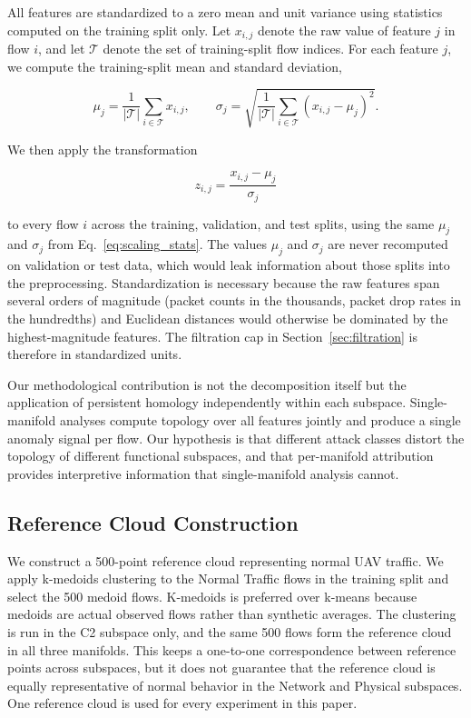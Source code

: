 \documentclass[conf]{new-aiaa}
\begin{document}
All features are standardized to a zero mean and unit variance using statistics computed on the training split only. Let $x_{i,j}$ denote the raw value of feature $j$ in flow $i$, and let $\mathcal{T}$ denote the set of training-split flow indices. For each feature $j$, we compute the training-split mean and standard deviation,

\begin{equation}
\mu_j = \frac{1}{|\mathcal{T}|} \sum_{i \in \mathcal{T}} x_{i,j}, \qquad \sigma_j = \sqrt{\frac{1}{|\mathcal{T}|} \sum_{i \in \mathcal{T}} (x_{i,j} - \mu_j)^2}.
\label{eq:scaling_stats}
\end{equation}

We then apply the transformation

\begin{equation}
z_{i,j} = \frac{x_{i,j} - \mu_j}{\sigma_j}
\label{eq:zscore}
\end{equation}

to every flow $i$ across the training, validation, and test splits, using the same $\mu_j$ and $\sigma_j$ from Eq.~\eqref{eq:scaling_stats}. The values $\mu_j$ and $\sigma_j$ are never recomputed on validation or test data, which would leak information about those splits into the preprocessing. Standardization is necessary because the raw features span several orders of magnitude (packet counts in the thousands, packet drop rates in the hundredths) and Euclidean distances would otherwise be dominated by the highest-magnitude features. The filtration cap in Section~\ref{sec:filtration} is therefore in standardized units.

Our methodological contribution is not the decomposition itself but the application of persistent homology independently within each subspace. Single-manifold analyses compute topology over all features jointly and produce a single anomaly signal per flow. Our hypothesis is that different attack classes distort the topology of different functional subspaces, and that per-manifold attribution provides interpretive information that single-manifold analysis cannot.

\subsection{Reference Cloud Construction}
\label{sec:reference}

We construct a 500-point reference cloud representing normal UAV traffic. We apply k-medoids clustering \cite{Kaufman} to the Normal Traffic flows in the training split and select the 500 medoid flows. K-medoids is preferred over k-means because medoids are actual observed flows rather than synthetic averages. The clustering is run in the C2 subspace only, and the same 500 flows form the reference cloud in all three manifolds. This keeps a one-to-one correspondence between reference points across subspaces, but it does not guarantee that the reference cloud is equally representative of normal behavior in the Network and Physical subspaces. One reference cloud is used for every experiment in this paper.
\end{document}
